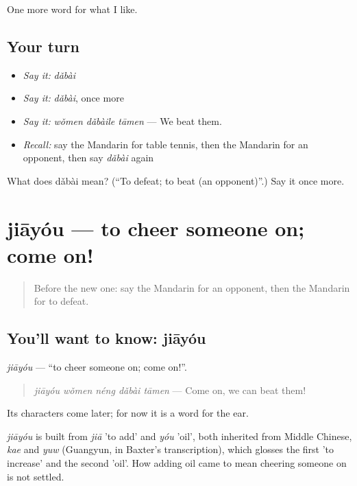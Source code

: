 \begin{grammarlens}[title={What you've built}]
One more word for what I like.
\end{grammarlens}

\subsection*{Your turn}
\begin{itemize}
\raggedright
  \item \emph{Say it:} \emph{dǎbài}
  \item \emph{Say it:} \emph{dǎbài}, once more
  \item \emph{Say it:} \emph{wǒmen dǎbàile tāmen} — We beat them.
  \item \emph{Recall:} say the Mandarin for table tennis, then the Mandarin for an opponent, then say \emph{dǎbài} again
\end{itemize}

\begin{tcolorbox}[breakable,colback=teal!4,colframe=teal!35!black,title={Before you move on}]
What does dǎbài mean? (\textquotedblleft{}To defeat; to beat (an opponent)\textquotedblright{}.) Say it once more.
\end{tcolorbox}
\section[jiāyóu]{jiāyóu — to cheer someone on; come on!}

\label{lesson:ZH-C262-jiayou}



\begin{quote}
Before the new one: say the Mandarin for an opponent, then the Mandarin for to defeat.
\end{quote}

\subsection*{You'll want to know: jiāyóu}
\emph{jiāyóu} — \textquotedblleft{}to cheer someone on; come on!\textquotedblright{}.

\begin{quote}
\emph{jiāyóu wǒmen néng dǎbài tāmen} — Come on, we can beat them!
\end{quote}

Its characters come later; for now it is a word for the ear.

\begin{cousinweb}
\emph{jiāyóu} is built from \emph{jiā} 'to add' and \emph{yóu} 'oil', both inherited from Middle Chinese, \emph{kae} and \emph{yuw} (Guangyun, in Baxter's transcription), which glosses the first 'to increase' and the second 'oil'. How adding oil came to mean cheering someone on is not settled.
\end{cousinweb}

